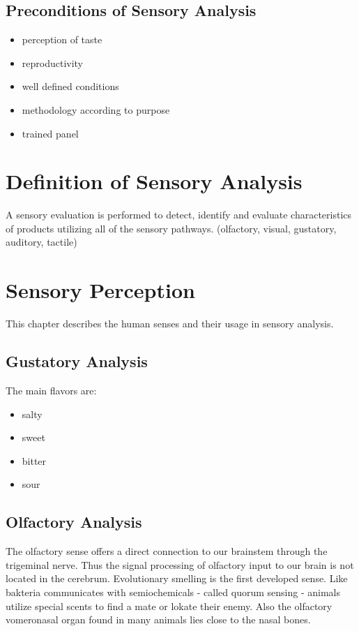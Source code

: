 \documentclass[]{scrartcl}
\begin{document}
\subsection{Preconditions of Sensory Analysis}
\begin{itemize}
    \item perception of taste
    \item reproductivity
    \item well defined conditions
    \item methodology according to purpose
    \item trained panel
  \end{itemize}

\section{Definition of Sensory Analysis}
A sensory evaluation is performed to detect, identify and evaluate
characteristics of products utilizing all of the sensory pathways.
(olfactory, visual, gustatory, auditory, tactile)


\newpage
\section{Sensory Perception}
This chapter describes the human senses and their usage in sensory analysis.
\subsection{Gustatory Analysis}
The main flavors are:
\begin{itemize}
  \item salty
  \item sweet
  \item bitter
  \item sour
\end{itemize}

\subsection{Olfactory Analysis}
The olfactory sense offers a direct connection to our brainstem through the trigeminal nerve.
Thus the signal processing of olfactory input to our brain is not located in the cerebrum.
Evolutionary smelling is the first developed sense. Like bakteria communicates with semiochemicals
- called quorum sensing - animals utilize special scents to find a mate or lokate their enemy. Also the olfactory
vomeronasal organ found in many animals lies close to the nasal bones.
\end{document}
